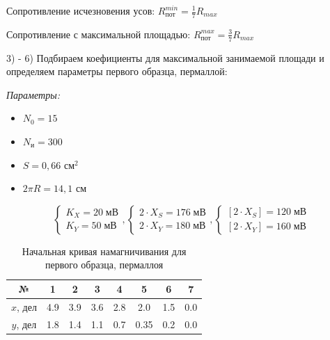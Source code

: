 \documentclass[a4paper,12pt]{extarticle}
\begin{document}
Сопротивление исчезновения усов: $R^{min}_{\text{пот}} = \frac{1}{7} R_{max}$

Сопротивление с максимальной площадью: $R^{max}_{\text{пот}} = \frac{3}{7} R_{max}$

3) - 6) Подбираем коефициенты для максимальной занимаемой площади и определяем параметры первого образца, пермаллой:

\textit{Параметры:} 
\begin{itemize}
    \item $N_0 = 15$
    \item $N_{\text{и}} = 300$
    \item $S = 0,66$ см$^2$
    \item $2\pi R = 14,1$ см
    
\end{itemize}

\begin{equation*}
    \begin{cases}
        K_X = 20 \;\text{мВ}
        \\
        K_Y = 50 \;\text{мВ}
    \end{cases}
    ,
    \begin{cases}
        2\cdot X_S = 176 \;\text{мВ}
        \\
        2\cdot X_Y = 180 \;\text{мВ}
    \end{cases}
    ,
    \begin{cases}
        [2\cdot X_S] = 120 \;\text{мВ}
        \\
        [2\cdot X_Y] = 160 \;\text{мВ}
    \end{cases}
\end{equation*}

\begin{table}[h!]
  		\caption{Начальная кривая намагничивания для первого образца, пермаллоя}
  		\begin{center}
  			\begin{tabular}{|c|c|c|c|c|c|c|c|} 
  				\hline 
  				№ &  1 &  2 & 3 & 4 & 5 &  6  & 7 \\ 	\hline
  				
  			 $ x $, дел & 4.9 & 3.9 & 3.6 & 2.8 & 2.0 & 1.5 & 0.0 \\
  				 $ y $, дел & 1.8 & 1.4 & 1.1 & 0.7  & 0.35 & 0.2 & 0.0 \\
  				\hline
  				
  			\end{tabular}
  		\end{center}
  	\end{table}
\end{document}

